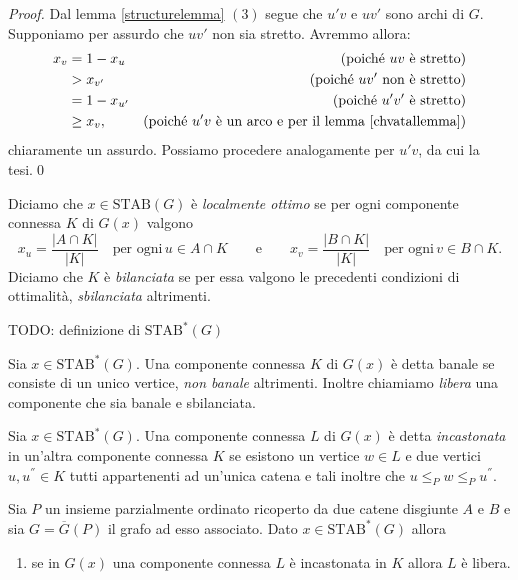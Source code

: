 {\begin{proof}
	Dal lemma \ref{structurelemma} \((3)\) segue che \(u'v\) e \(uv'\) sono archi di \(G\). Supponiamo per assurdo che \(uv'\) non sia stretto. Avremmo allora: 
	\begin{align}
		x_v &= 1-x_u &\text{(poich\'e } uv \text{ \`e stretto)}\nonumber \\
		&> x_{v'} &\text{(poich\'e } uv' \text{ non \`e stretto)}\nonumber \\
		&= 1-x_{u'} &\text{(poich\'e } u'v' \text{ \`e stretto)}\nonumber \\
		&\ge x_{v}, &\text{(poich\'e } u'v \text{ \`e un arco e per il lemma \ref{chvatallemma})}\nonumber 
	\end{align}
	chiaramente un assurdo. Possiamo procedere analogamente per \(u'v\), da cui la tesi.\qed 
\end{proof}
\begin{definition}
	Diciamo che \(x\in\text{STAB}(G)\) è \emph{localmente ottimo} se per ogni componente connessa \(K\) di \(G(x)\) valgono
	\[x_u=\frac{|A\cap K|}{|K|}\quad\text{per ogni}\,u\in A\cap K\qquad\text{e}\qquad x_v=\frac{|B\cap K|}{|K|}\quad\text{per ogni}\,v\in B\cap K.\]
	Diciamo che \(K\) è \emph{bilanciata} se per essa valgono le precedenti condizioni di ottimalità, \emph{sbilanciata} altrimenti. 
\end{definition}
TODO: definizione di \(\text{STAB}^*(G)\) 
\begin{definition}
	Sia \(x\in\text{STAB}^*(G)\). Una componente connessa \(K\) di \(G(x)\) è detta banale se consiste di un unico vertice, \emph{non banale} altrimenti. Inoltre chiamiamo \emph{libera} una componente che sia banale e sbilanciata. 
\end{definition}
\begin{definition}
	Sia \(x\in\text{STAB}^{*}(G)\). Una componente connessa \(L\) di \(G(x)\) è detta \emph{incastonata} in un'altra componente connessa \(K\) se esistono un vertice \(w\in L\) e due vertici \(u,u^{''}\in K\) tutti appartenenti ad un'unica catena e tali inoltre che \(u\le_{P}w\le_{P}u^{''}\). 
\end{definition}
\begin{lemma}
	\label{inlaylemma} Sia \(P\) un insieme parzialmente ordinato ricoperto da due catene disgiunte \(A\) e \(B\) e sia \(G=\overline{G}(P)\) il grafo ad esso associato. Dato \(x\in\text{STAB}^{*}(G)\) allora 
	\begin{enumerate}
		\item se in \(G(x)\) una componente connessa \(L\) è incastonata in \(K\) allora \(L\) è libera. 

\end{enumerate}
\end{lemma}}
